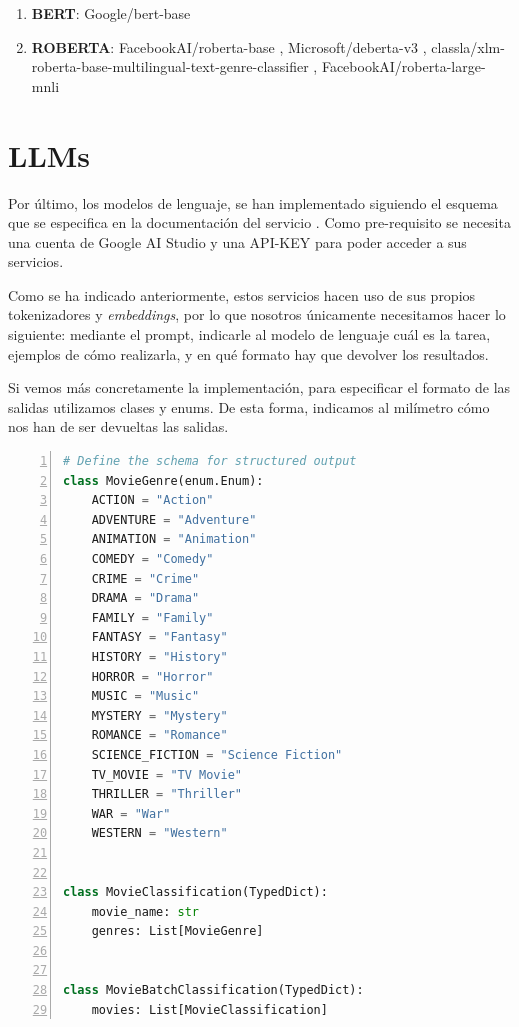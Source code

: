 \documentclass[11pt,spanish,listoffigures,listoftables]{tfgetsinf}
\begin{document}
\begin{enumerate}
    \item \textbf{BERT}: Google/bert-base \cite{google-bert-base}
    \item \textbf{ROBERTA}: FacebookAI/roberta-base \cite{FacebookAI-roberta-base}, Microsoft/deberta-v3 \cite{Microsoft-deberta-v3}, classla/xlm-roberta-base-multilingual-text-genre-classifier \cite{classla-xlm-roberta-base}, FacebookAI/roberta-large-mnli \cite{FacebookAI-roberta-large}
\end{enumerate}


\section{LLMs}
Por último, los modelos de lenguaje, se han implementado siguiendo el esquema que se especifica en la documentación del servicio \cite{Google-Gemini}. Como pre-requisito se necesita una cuenta de Google AI Studio y una API-KEY para poder acceder a sus servicios.

Como se ha indicado anteriormente, estos servicios hacen uso de sus propios tokenizadores y \textit{embeddings}, por lo que nosotros únicamente necesitamos hacer lo siguiente: mediante el prompt, indicarle al modelo de lenguaje cuál es la tarea, ejemplos de cómo realizarla, y en qué formato hay que devolver los resultados.

Si vemos más concretamente la implementación, para especificar el formato de las salidas utilizamos clases y enums. De esta forma, indicamos al milímetro cómo nos han de ser devueltas las salidas. 

\begin{lstlisting}[language=Python, basicstyle=\ttfamily\small, frame=single, numbers=left, breaklines=true]
# Define the schema for structured output
class MovieGenre(enum.Enum):
    ACTION = "Action"
    ADVENTURE = "Adventure"
    ANIMATION = "Animation"
    COMEDY = "Comedy"
    CRIME = "Crime"
    DRAMA = "Drama"
    FAMILY = "Family"
    FANTASY = "Fantasy"
    HISTORY = "History"
    HORROR = "Horror"
    MUSIC = "Music"
    MYSTERY = "Mystery"
    ROMANCE = "Romance"
    SCIENCE_FICTION = "Science Fiction"
    TV_MOVIE = "TV Movie"
    THRILLER = "Thriller"
    WAR = "War"
    WESTERN = "Western"


class MovieClassification(TypedDict):
    movie_name: str
    genres: List[MovieGenre]


class MovieBatchClassification(TypedDict):
    movies: List[MovieClassification]
\end{lstlisting}
\end{document}
